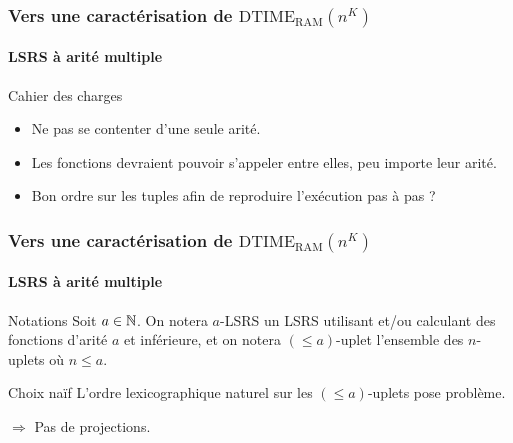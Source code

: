 \documentclass[10pt]{beamer}
\newcommand{\dtimeram}{\text{DTIME}_{\text{RAM}}\left( n^K \right)}
\newcommand{\leqa}{\left( \leqslant a \right)}
\begin{document}
	
	\begin{frame}
		\frametitle{Vers une caractérisation de $\dtimeram$}
		\framesubtitle{LSRS à arité multiple}
		
		
		\begin{block}{Cahier des charges}
			\begin{itemize}
				\item 	Ne pas se contenter d'une seule arité. %
				\pause 
				\item 	Les fonctions devraient pouvoir s'appeler entre elles, peu importe leur arité. %
				\item 	Bon ordre sur les tuples afin de reproduire l'exécution pas à pas ?
			\end{itemize}
		\end{block}
		
	\end{frame}
	
	
	\begin{frame}
		\frametitle{Vers une caractérisation de $\dtimeram$}
		\framesubtitle{LSRS à arité multiple}

		\begin{block}{Notations}
			Soit $a \in \mathbb{N}$. On notera $a$-LSRS un LSRS utilisant et/ou calculant des fonctions d'arité $a$ et inférieure, et on notera $\leqa$-uplet l'ensemble des $n$-uplets où $n \leqslant a$.
		\end{block}
		
		\pause 
		
		\begin{block}{Choix naïf}
			L'ordre lexicographique naturel sur les $\leqa$-uplets pose problème.
			
			$\Rightarrow$ Pas de projections.
		\end{block}
	\end{frame}
	
\end{document}
